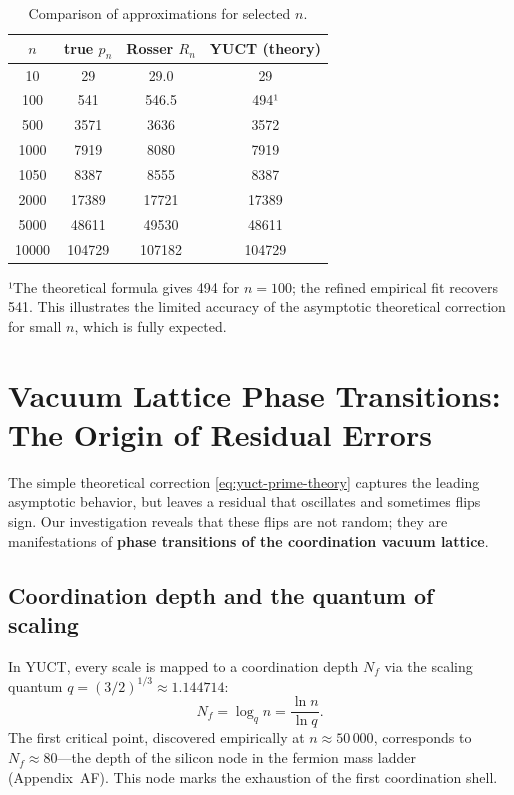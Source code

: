 \documentclass[12pt,a4paper]{article}
\begin{document}
	\begin{table}[htbp]
		\centering
		\caption{Comparison of approximations for selected \(n\).}
		\label{tab:comparison}
		\small
		\begin{tabular}{c c c c}
			\toprule
			\(n\) & true \(p_n\) & Rosser \(R_n\) & YUCT (theory) \\
			\midrule
			10   & 29      & 29.0  & 29  \\
			100  & 541     & 546.5 & 494¹ \\
			500  & 3571    & 3636  & 3572 \\
			1000 & 7919    & 8080  & 7919 \\
			1050 & 8387    & 8555  & 8387 \\
			2000 & 17389   & 17721 & 17389\\
			5000 & 48611   & 49530 & 48611\\
			10000& 104729  & 107182& 104729\\
			\bottomrule
		\end{tabular}
		\par\smallskip
		\footnotesize
		¹The theoretical formula gives 494 for \(n=100\); the refined empirical fit recovers 541. This illustrates the limited accuracy of the asymptotic theoretical correction for small \(n\), which is fully expected.
	\end{table}
	
	\section{Vacuum Lattice Phase Transitions: The Origin of Residual Errors}
	\label{sec:phasetrans}
	The simple theoretical correction \eqref{eq:yuct-prime-theory} captures the leading asymptotic behavior, but leaves a residual that oscillates and sometimes flips sign. Our investigation reveals that these flips are not random; they are manifestations of \textbf{phase transitions of the coordination vacuum lattice}.
	
	\subsection{Coordination depth and the quantum of scaling}
	In YUCT, every scale is mapped to a coordination depth \(N_f\) via the scaling quantum \(q = (3/2)^{1/3} \approx 1.144714\):
	\[
	N_f = \log_q n = \frac{\ln n}{\ln q}.
	\]
	The first critical point, discovered empirically at \(n \approx 50\,000\), corresponds to \(N_f \approx 80\)---the depth of the silicon node in the fermion mass ladder (Appendix~AF). This node marks the exhaustion of the first coordination shell.
	
\end{document}
